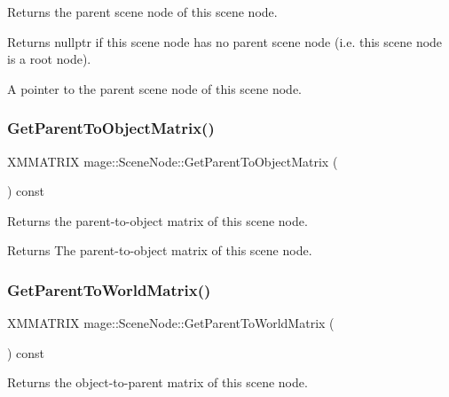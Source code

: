 Returns the parent scene node of this scene node.

\begin{DoxyReturn}{Returns}
{\ttfamily nullptr} if this scene node has no parent scene node (i.\+e. this scene node is a root node). 

A pointer to the parent scene node of this scene node. 
\end{DoxyReturn}
\hypertarget{classmage_1_1_scene_node_a5ec8b0d2e5ba7873842c0fa65e1248bb}{}\label{classmage_1_1_scene_node_a5ec8b0d2e5ba7873842c0fa65e1248bb} 
\subsubsection{\texorpdfstring{Get\+Parent\+To\+Object\+Matrix()}{GetParentToObjectMatrix()}}
{\footnotesize\ttfamily X\+M\+M\+A\+T\+R\+IX mage\+::\+Scene\+Node\+::\+Get\+Parent\+To\+Object\+Matrix (\begin{DoxyParamCaption}{ }\end{DoxyParamCaption}) const}

Returns the parent-\/to-\/object matrix of this scene node.

\begin{DoxyReturn}{Returns}
The parent-\/to-\/object matrix of this scene node. 
\end{DoxyReturn}
\hypertarget{classmage_1_1_scene_node_afb199589e809c3cb0e46a691a737e5da}{}\label{classmage_1_1_scene_node_afb199589e809c3cb0e46a691a737e5da} 
\subsubsection{\texorpdfstring{Get\+Parent\+To\+World\+Matrix()}{GetParentToWorldMatrix()}}
{\footnotesize\ttfamily X\+M\+M\+A\+T\+R\+IX mage\+::\+Scene\+Node\+::\+Get\+Parent\+To\+World\+Matrix (\begin{DoxyParamCaption}{ }\end{DoxyParamCaption}) const}

Returns the object-\/to-\/parent matrix of this scene node.

